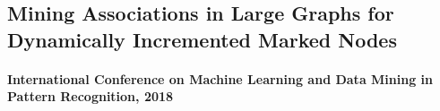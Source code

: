 \subsection{Mining Associations in Large Graphs for Dynamically Incremented Marked Nodes}
\paragraph{International Conference on Machine Learning and Data Mining in Pattern Recognition, 2018}
